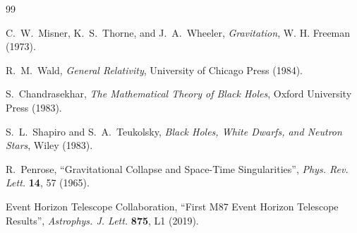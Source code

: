 \documentclass[a4paper,12pt]{article}
\numberwithin{equation}{section}
\begin{document}
\begin{thebibliography}{99}

C.~W.~Misner, K.~S.~Thorne, and J.~A.~Wheeler,
\emph{Gravitation},
W. H. Freeman (1973).

R.~M.~Wald,
\emph{General Relativity},
University of Chicago Press (1984).

S.~Chandrasekhar,
\emph{The Mathematical Theory of Black Holes},
Oxford University Press (1983).

S.~L.~Shapiro and S.~A.~Teukolsky,
\emph{Black Holes, White Dwarfs, and Neutron Stars},
Wiley (1983).

R.~Penrose,
``Gravitational Collapse and Space-Time Singularities'',
\emph{Phys. Rev. Lett.} \textbf{14}, 57 (1965).

Event Horizon Telescope Collaboration,
``First M87 Event Horizon Telescope Results'',
\emph{Astrophys. J. Lett.} \textbf{875}, L1 (2019).

\end{thebibliography}
\end{document}
